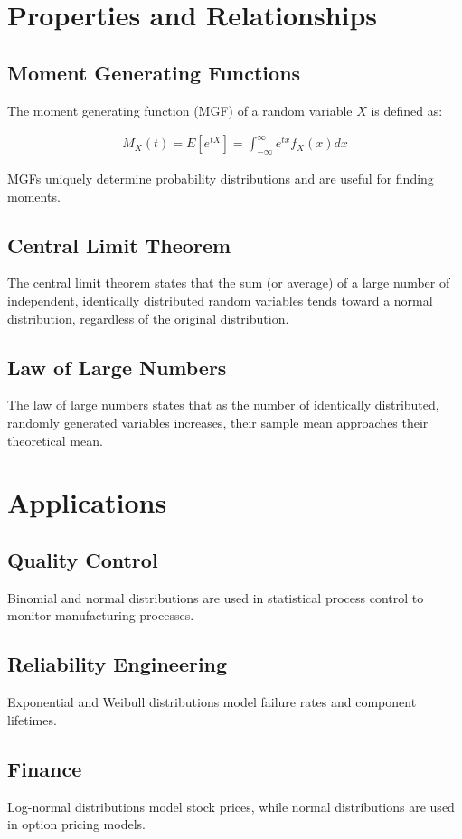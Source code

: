 \documentclass[12pt,a4paper]{article}
\begin{document}
\section{Properties and Relationships}
\subsection{Moment Generating Functions}
The moment generating function (MGF) of a random variable $X$ is defined as:

\begin{align}
M_X(t) = E[e^{tX}] = \int_{-\infty}^{\infty} e^{tx} f_X(x) dx
\end{align}

MGFs uniquely determine probability distributions and are useful for finding moments.

\subsection{Central Limit Theorem}
The central limit theorem states that the sum (or average) of a large number of independent, identically distributed random variables tends toward a normal distribution, regardless of the original distribution.

\subsection{Law of Large Numbers}
The law of large numbers states that as the number of identically distributed, randomly generated variables increases, their sample mean approaches their theoretical mean.

\section{Applications}
\subsection{Quality Control}
Binomial and normal distributions are used in statistical process control to monitor manufacturing processes.

\subsection{Reliability Engineering}
Exponential and Weibull distributions model failure rates and component lifetimes.

\subsection{Finance}
Log-normal distributions model stock prices, while normal distributions are used in option pricing models.
\end{document}
